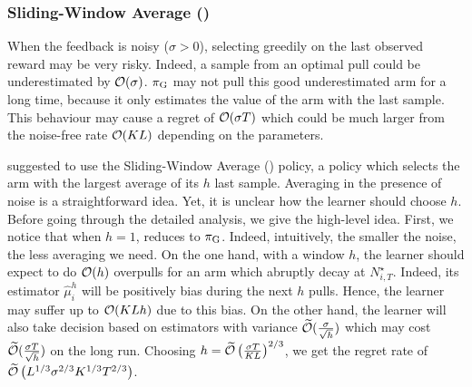\subsubsection{Sliding-Window Average ({\SWA})}
When the feedback is noisy ($\sigma > 0$), selecting greedily on the last observed reward may be very risky. Indeed, a sample from an optimal pull could be underestimated by $\mathcal{O}(\sigma)$. $\pi_{\rm G}$ may not pull this good underestimated arm for a long time, because it only estimates the value of the arm with the last sample. This behaviour may cause a regret of $\mathcal{O}(\sigma T)$ which could be much larger from the noise-free rate $\mathcal{O}(KL)$ depending on the parameters.

\citet{levine2017rotting} suggested to use the Sliding-Window Average (\SWA) policy, a policy which selects the arm with the largest average of its $h$ last sample. Averaging in the presence of noise is a straightforward idea. Yet, it is unclear how the learner should choose $h$. Before going through the detailed analysis, we give the high-level idea. First, we notice that when $h=1$, \SWA reduces to $\pi_{\rm G}$. Indeed, intuitively, the smaller the noise, the less averaging we need. On the one hand, with a window $h$, the learner should expect to do $\mathcal{O}(h)$ overpulls for an arm which abruptly decay at $N_{i,T}^\star$. Indeed, its estimator $\hat{\mu}_i^h$ will be positively bias during the next $h$ pulls. Hence, the learner may suffer up to $\mathcal{O}(KLh)$ due to this bias. On the other hand, the learner will also take decision based on estimators with variance $\widetilde{\mathcal{O}}(\frac{\sigma}{\sqrt{h}})$ which may cost $\widetilde{\mathcal{O}}(\frac{\sigma T}{\sqrt{h}})$ on the long run. Choosing $h = \widetilde{\mathcal{O}}\left(\frac{ \sigma T}{KL}\right)^{2/3}$, we get the regret rate of $\widetilde{\mathcal{O}}\left(L^{1/3} \sigma^{2/3} K^{1/3} T^{2/3}\right)$. 


